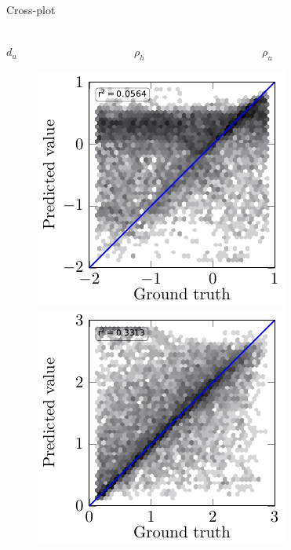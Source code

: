 \begin{frame}{Cross-plot}
\centering
\setlength{\fboxrule}{0.5mm}
\setlength{\fboxsep}{1mm}
\color{red}
\color{black}

$\qquad$ \\
\hspace{0.5cm} $d_u$ $\qquad \qquad \qquad \qquad \qquad$ $\rho_h$ $\qquad \qquad \qquad \qquad \qquad$ $\rho_u$
\begin{figure}[!h]
\centering
	{%
		\includegraphics[scale=0.8]{Diapos/DL_For_Inv/Figures/Syn_example/Cross_plots/Two_Step_loss/C_P_4/d_u.pdf}
		\hspace{0.1cm}
		\includegraphics[scale=0.8]{Diapos/DL_For_Inv/Figures/Syn_example/Cross_plots/Two_Step_loss/C_P_4/rho_h.pdf}
}
\end{figure}
\end{frame}
